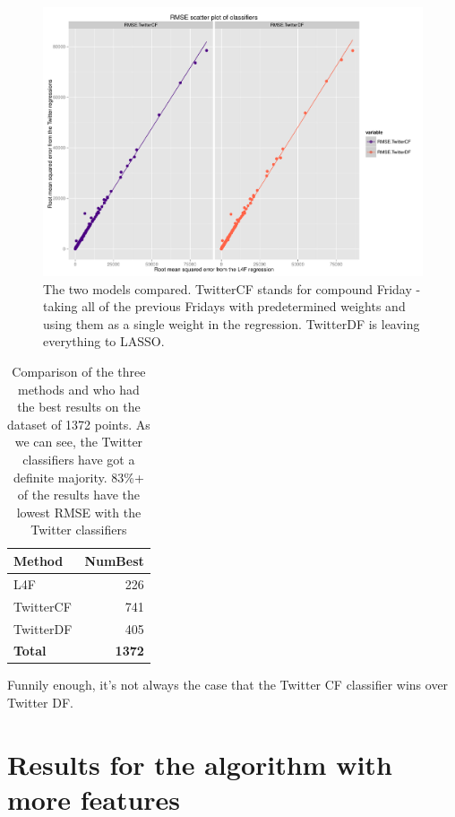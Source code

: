 \documentclass[minf,frontabs,twoside,singlespacing,parskip]{infthesis}
\begin{document}
\begin{figure}[h!]
\begin{center}
\includegraphics[scale=0.4]{rmse_scatter_by_reg}
\end{center}
\caption{The two models compared. TwitterCF stands for compound Friday - taking all of the previous Fridays with predetermined weights and using them as a single weight in the regression. TwitterDF is leaving everything to LASSO.}
\end{figure}

\begin{table}[h!]
\begin{center}
\begin{tabular}{ l | r }
Method & NumBest \\
\hline
L4F & 226 \\
TwitterCF & 741 \\
TwitterDF & 405 \\
\hline
\textbf{Total} & \textbf{1372}
\end{tabular}
\end{center}
\caption{Comparison of the three methods and who had the best results on the dataset of 1372 points. As we can see, the Twitter classifiers have got a definite majority. 83\%+ of the results have the lowest RMSE with the Twitter classifiers}
\end{table}

Funnily enough, it's not always the case that the Twitter CF classifier wins over Twitter DF.


\section{Results for the algorithm with more features}
\end{document}
